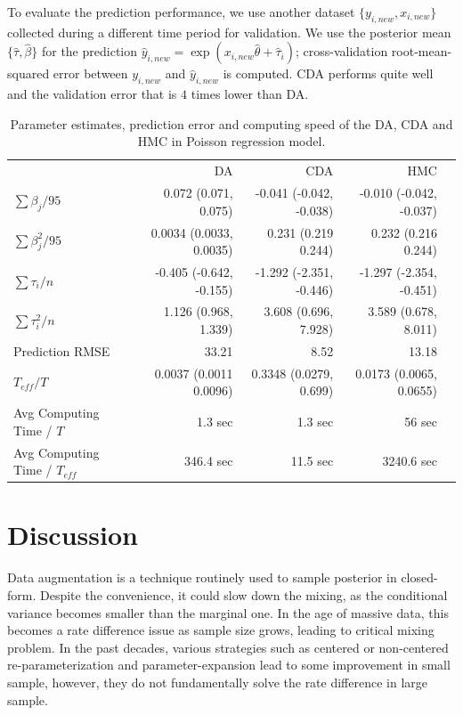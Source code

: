 \documentclass[10pt]{article}
\begin{document}
To evaluate the prediction performance, we use another dataset $\{y_{i,new},x_{i,new} \}$ collected during a different time period for validation. We use the posterior mean $\{\hat\tau, \hat \beta\}$ for the prediction $\hat y_{i,new}=\exp( x_{i,new}{\hat\theta} + \hat\tau_i)$; cross-validation root-mean-squared error between $y_{i,new}$ and $\hat y_{i,new}$ is computed. CDA performs quite well and the validation error that is $4$ times lower than DA.


\begin{table}[H]
\centering
\begin{tabular}{|l |r |r| r| r |} 
 \hline
                          & DA & CDA & HMC\\
 [0.5ex]
$\sum \beta_j / 95$         & 0.072 (0.071, 0.075)&  -0.041 (-0.042, -0.038)  & -0.010 (-0.042, -0.037) \\
$\sum \beta_j^2 / 95$         & 0.0034 (0.0033, 0.0035)&  0.231 (0.219 0.244)  & 0.232 (0.216 0.244)   \\
$\sum\tau_i/n$         & -0.405 (-0.642, -0.155)&  -1.292 (-2.351, -0.446)  &  -1.297 (-2.354, -0.451)  \\
$\sum\tau_i^2/n$         & 1.126 (0.968, 1.339)&  3.608 (0.696, 7.928)  & 3.589 (0.678, 8.011)  \\
Prediction RMSE                           & 33.21        & 8.52          & 13.18\\
$T_{eff} / T$ & 0.0037 (0.0011 0.0096) & 0.3348 (0.0279, 0.699) &  0.0173 (0.0065, 0.0655) \\
Avg Computing Time /  $T$  & 1.3 sec       & 1.3 sec        & 56 sec\\
Avg Computing Time /  $T_{eff}$  & 346.4 sec       & 11.5 sec        & 3240.6 sec\\
 \hline
\end{tabular}
\caption{Parameter estimates, prediction error and computing speed of the DA, CDA and HMC in Poisson regression model.}
\label{table:Poisson}
\end{table}

\section{Discussion}
Data augmentation is a technique routinely used to sample posterior in closed-form. Despite the convenience, it could slow down the mixing, as the conditional variance becomes smaller than the marginal one. In the age of massive data, this becomes a rate difference issue as sample size grows, leading to critical mixing problem. In the past decades, various strategies such as centered or non-centered re-parameterization \citep{papaspiliopoulos2007general} and parameter-expansion \citep{liu1999parameter} lead to some improvement in small sample, however, they do not fundamentally solve the rate difference in large sample.
\end{document}
